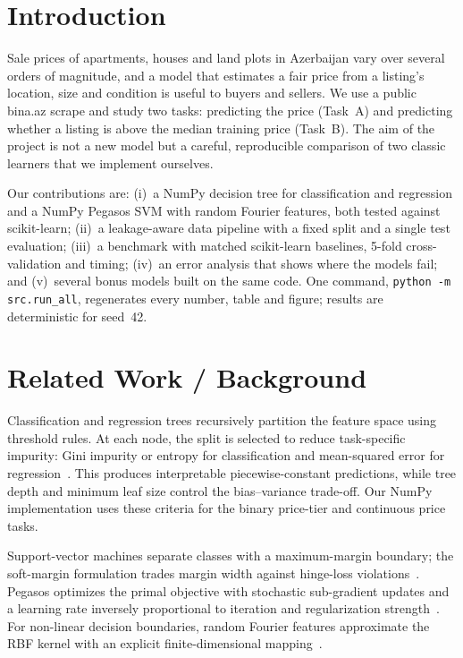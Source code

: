 \documentclass[10pt,twocolumn,a4paper]{article}
\begin{document}
\section{Introduction}
Sale prices of apartments, houses and land plots in Azerbaijan vary over
several orders of magnitude, and a model that estimates a fair price from a
listing's location, size and condition is useful to buyers and sellers. We use
a public bina.az scrape and study two tasks: predicting the price (Task~A) and
predicting whether a listing is above the median training price (Task~B).
The aim of the project is not a new model but a careful, reproducible
comparison of two classic learners that we implement ourselves.

Our contributions are: (i)~a NumPy decision tree for classification and
regression and a NumPy Pegasos SVM with random Fourier features, both tested
against scikit-learn; (ii)~a leakage-aware data pipeline with a fixed split
and a single test evaluation; (iii)~a benchmark with matched scikit-learn
baselines, 5-fold cross-validation and timing; (iv)~an error analysis
that shows where the models fail; and (v)~several bonus models built on
the same code. One command, \texttt{python -m src.run\_all}, regenerates
every number, table and figure; results are deterministic for seed~42.

\section{Related Work / Background}
Classification and regression trees recursively partition the feature
space using threshold rules. At each node, the split is selected to reduce
task-specific impurity: Gini impurity or entropy for classification and
mean-squared error for regression~\cite{breiman1984}. This produces
interpretable piecewise-constant predictions, while tree depth and minimum
leaf size control the bias--variance trade-off. Our NumPy implementation
uses these criteria for the binary price-tier and continuous price tasks.

Support-vector machines separate classes with a maximum-margin boundary;
the soft-margin formulation trades margin width against hinge-loss
violations~\cite{cortes1995}. Pegasos optimizes the primal objective with
stochastic sub-gradient updates and a learning rate inversely proportional
to iteration and regularization strength~\cite{pegasos}. For non-linear
decision boundaries, random Fourier features approximate the RBF kernel
with an explicit finite-dimensional mapping~\cite{rahimi2007}.
\end{document}

